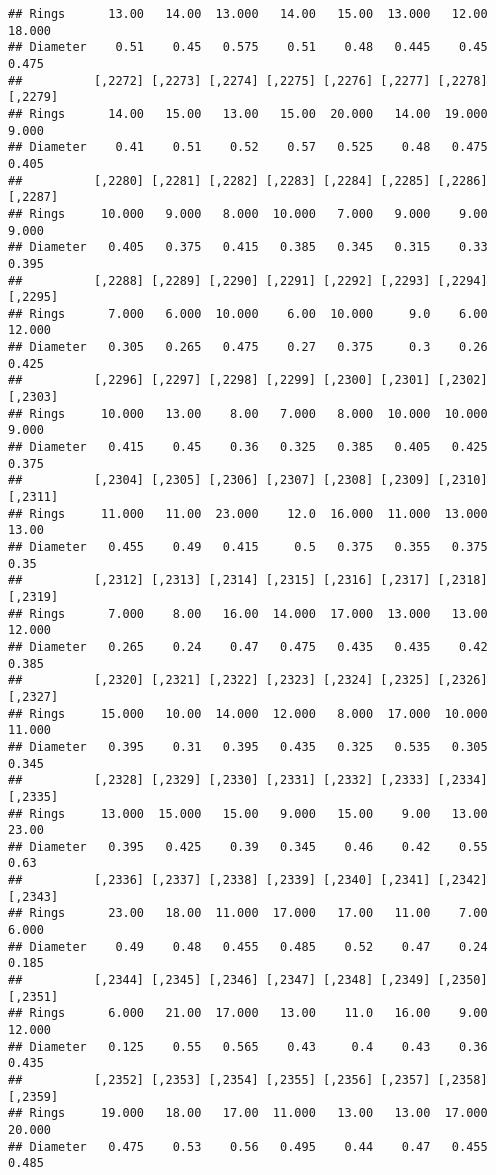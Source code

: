 \documentclass[
]{article}
\begin{document}
\begin{verbatim}
## Rings      13.00   14.00  13.000   14.00   15.00  13.000   12.00  18.000
## Diameter    0.51    0.45   0.575    0.51    0.48   0.445    0.45   0.475
##          [,2272] [,2273] [,2274] [,2275] [,2276] [,2277] [,2278] [,2279]
## Rings      14.00   15.00   13.00   15.00  20.000   14.00  19.000   9.000
## Diameter    0.41    0.51    0.52    0.57   0.525    0.48   0.475   0.405
##          [,2280] [,2281] [,2282] [,2283] [,2284] [,2285] [,2286] [,2287]
## Rings     10.000   9.000   8.000  10.000   7.000   9.000    9.00   9.000
## Diameter   0.405   0.375   0.415   0.385   0.345   0.315    0.33   0.395
##          [,2288] [,2289] [,2290] [,2291] [,2292] [,2293] [,2294] [,2295]
## Rings      7.000   6.000  10.000    6.00  10.000     9.0    6.00  12.000
## Diameter   0.305   0.265   0.475    0.27   0.375     0.3    0.26   0.425
##          [,2296] [,2297] [,2298] [,2299] [,2300] [,2301] [,2302] [,2303]
## Rings     10.000   13.00    8.00   7.000   8.000  10.000  10.000   9.000
## Diameter   0.415    0.45    0.36   0.325   0.385   0.405   0.425   0.375
##          [,2304] [,2305] [,2306] [,2307] [,2308] [,2309] [,2310] [,2311]
## Rings     11.000   11.00  23.000    12.0  16.000  11.000  13.000   13.00
## Diameter   0.455    0.49   0.415     0.5   0.375   0.355   0.375    0.35
##          [,2312] [,2313] [,2314] [,2315] [,2316] [,2317] [,2318] [,2319]
## Rings      7.000    8.00   16.00  14.000  17.000  13.000   13.00  12.000
## Diameter   0.265    0.24    0.47   0.475   0.435   0.435    0.42   0.385
##          [,2320] [,2321] [,2322] [,2323] [,2324] [,2325] [,2326] [,2327]
## Rings     15.000   10.00  14.000  12.000   8.000  17.000  10.000  11.000
## Diameter   0.395    0.31   0.395   0.435   0.325   0.535   0.305   0.345
##          [,2328] [,2329] [,2330] [,2331] [,2332] [,2333] [,2334] [,2335]
## Rings     13.000  15.000   15.00   9.000   15.00    9.00   13.00   23.00
## Diameter   0.395   0.425    0.39   0.345    0.46    0.42    0.55    0.63
##          [,2336] [,2337] [,2338] [,2339] [,2340] [,2341] [,2342] [,2343]
## Rings      23.00   18.00  11.000  17.000   17.00   11.00    7.00   6.000
## Diameter    0.49    0.48   0.455   0.485    0.52    0.47    0.24   0.185
##          [,2344] [,2345] [,2346] [,2347] [,2348] [,2349] [,2350] [,2351]
## Rings      6.000   21.00  17.000   13.00    11.0   16.00    9.00  12.000
## Diameter   0.125    0.55   0.565    0.43     0.4    0.43    0.36   0.435
##          [,2352] [,2353] [,2354] [,2355] [,2356] [,2357] [,2358] [,2359]
## Rings     19.000   18.00   17.00  11.000   13.00   13.00  17.000  20.000
## Diameter   0.475    0.53    0.56   0.495    0.44    0.47   0.455   0.485

\end{verbatim}
\end{document}
